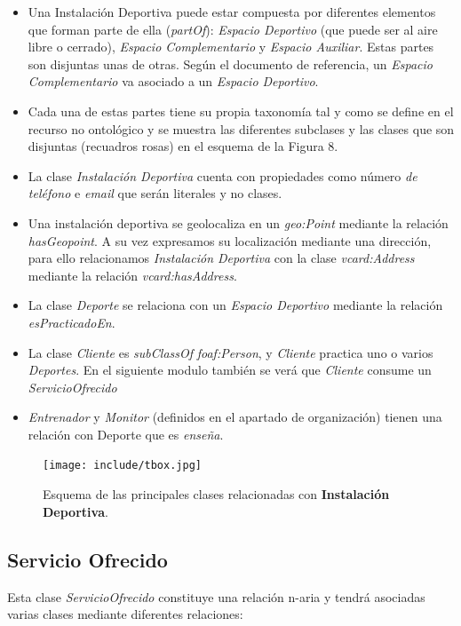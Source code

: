 \documentclass[a4paper,12pt]{article}
\begin{document}
	\begin{itemize}
		\item Una Instalación Deportiva puede estar compuesta por diferentes elementos que forman parte de ella (\textit{partOf}): \textit{Espacio Deportivo} (que puede ser al aire libre o cerrado), \textit{Espacio Complementario} y \textit{Espacio Auxiliar}. Estas partes son disjuntas unas de otras. Según el documento de referencia, un \textit{Espacio Complementario} va asociado a un \textit{Espacio Deportivo}.
		\item Cada una de estas partes tiene su propia taxonomía tal y como se define en el recurso no ontológico y se muestra las diferentes subclases y las clases que son disjuntas (recuadros rosas) en el esquema de la Figura 8.
		\item La clase \textit{Instalación Deportiva} cuenta con propiedades como número\textit{ de teléfono} e \textit{email} que serán literales y no clases.
		\item Una instalación deportiva se geolocaliza en un \textit{geo:Point} mediante la relación \textit{hasGeopoint}. A su vez expresamos su localización mediante una dirección, para ello relacionamos \textit{Instalación Deportiva} con la clase \textit{vcard:Address} mediante la relación \textit{vcard:hasAddress}.
		\item La clase \textit{Deporte} se relaciona con un \textit{Espacio Deportivo} mediante la relación \textit{esPracticadoEn}.
		\item La clase \textit{Cliente} es \textit{subClassOf} \textit{foaf:Person}, y \textit{Cliente} practica uno o varios \textit{Deportes}. En el siguiente modulo también se verá que \textit{Cliente} consume un \textit{ServicioOfrecido}
		\item \textit{Entrenador} y \textit{Monitor} (definidos en el apartado de organización) tienen una relación con Deporte que es \textit{enseña}.
	\end{itemize}

	\begin{figure}[H]
		\centering
		\texttt{[image: include/tbox.jpg]}
		\caption{Esquema de las principales clases relacionadas con \textbf{Instalación Deportiva}.}
	\end{figure}
		
	\subsection{Servicio Ofrecido}
	
	Esta clase \textit{ServicioOfrecido} constituye una relación n-aria y tendrá asociadas varias clases mediante diferentes relaciones:
	
\end{document}
